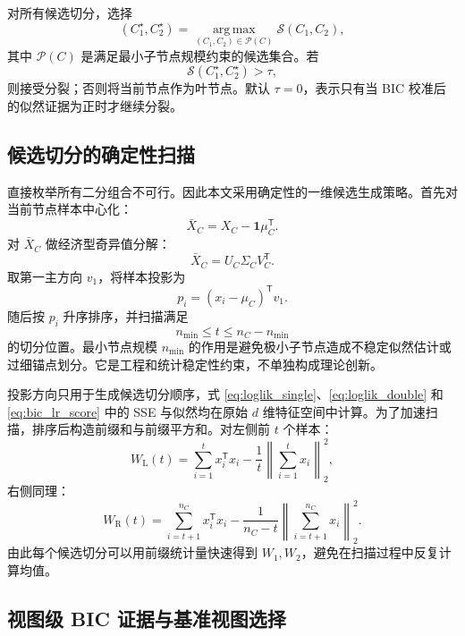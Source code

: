 \documentclass[UTF8,a4paper,12pt,fontset=none]{ctexart}
\newcommand{\argmax}{\operatorname*{arg\,max}}
\newcommand{\one}{\mathbf{1}}
\newcommand{\T}{\mathsf{T}}
\begin{document}
对所有候选切分，选择
\begin{equation}
(C_1^\star,C_2^\star)
=\argmax_{(C_1,C_2)\in\mathcal P(C)}
\mathcal S(C_1,C_2),
\end{equation}
其中 \(\mathcal P(C)\) 是满足最小子节点规模约束的候选集合。若
\begin{equation}
\mathcal S(C_1^\star,C_2^\star)>\tau ,
\end{equation}
则接受分裂；否则将当前节点作为叶节点。默认 \(\tau=0\)，表示只有当 BIC 校准后的似然证据为正时才继续分裂。

\subsection{候选切分的确定性扫描}

直接枚举所有二分组合不可行。因此本文采用确定性的一维候选生成策略。首先对当前节点样本中心化：
\begin{equation}
\bar X_C=X_C-\one\mu_C^\T .
\end{equation}
对 \(\bar X_C\) 做经济型奇异值分解：
\begin{equation}
\bar X_C=U_C\Sigma_CV_C^\T .
\end{equation}
取第一主方向 \(v_1\)，将样本投影为
\begin{equation}
p_i=(x_i-\mu_C)^\T v_1 .
\end{equation}
随后按 \(p_i\) 升序排序，并扫描满足
\begin{equation}
n_{\min}\le t\le n_C-n_{\min}
\end{equation}
的切分位置。最小节点规模 \(n_{\min}\) 的作用是避免极小子节点造成不稳定似然估计或过细锚点划分。它是工程和统计稳定性约束，不单独构成理论创新。

投影方向只用于生成候选切分顺序，式 \eqref{eq:loglik_single}、\eqref{eq:loglik_double} 和 \eqref{eq:bic_lr_score} 中的 SSE 与似然均在原始 \(d\) 维特征空间中计算。为了加速扫描，排序后构造前缀和与前缀平方和。对左侧前 \(t\) 个样本：
\begin{equation}
W_{\mathrm{L}}(t)
=
\sum_{i=1}^{t}x_i^\T x_i
-\frac{1}{t}
\left\|\sum_{i=1}^{t}x_i\right\|_2^2 ,
\end{equation}
右侧同理：
\begin{equation}
W_{\mathrm{R}}(t)
=
\sum_{i=t+1}^{n_C}x_i^\T x_i
-\frac{1}{n_C-t}
\left\|\sum_{i=t+1}^{n_C}x_i\right\|_2^2 .
\end{equation}
由此每个候选切分可以用前缀统计量快速得到 \(W_1,W_2\)，避免在扫描过程中反复计算均值。

\subsection{视图级 BIC 证据与基准视图选择}
\end{document}
